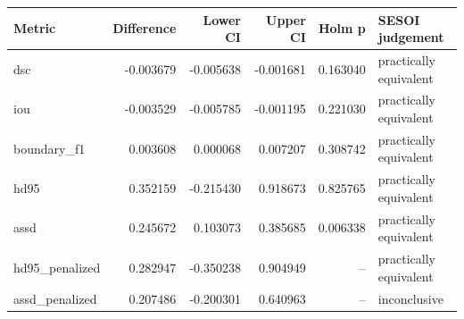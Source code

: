\begin{tabular}{lrrrrl}
Metric & Difference & Lower CI & Upper CI & Holm p & SESOI judgement \\
\hline
dsc & -0.003679 & -0.005638 & -0.001681 & 0.163040 & practically equivalent \\
iou & -0.003529 & -0.005785 & -0.001195 & 0.221030 & practically equivalent \\
boundary\_f1 & 0.003608 & 0.000068 & 0.007207 & 0.308742 & practically equivalent \\
hd95 & 0.352159 & -0.215430 & 0.918673 & 0.825765 & practically equivalent \\
assd & 0.245672 & 0.103073 & 0.385685 & 0.006338 & practically equivalent \\
hd95\_penalized & 0.282947 & -0.350238 & 0.904949 & -- & practically equivalent \\
assd\_penalized & 0.207486 & -0.200301 & 0.640963 & -- & inconclusive \\
\end{tabular}
